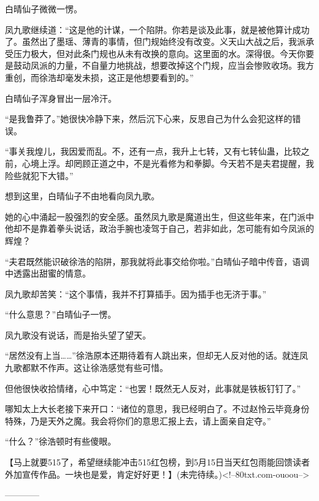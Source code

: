 \begin{this_body}
白晴仙子微微一愣。

凤九歌继续道：“这是他的计谋，一个陷阱。你若是谈及此事，就是被他算计成功了。虽然出了墨瑶、薄青的事情，但门规始终没有改变。义天山大战之后，我派承受压力极大，但对此条门规也从未有改换的意向。这里面的水。深得很。今天你要是鼓动凤派的力量，不自量力地挑战，想要改掉这个门规，应当会惨败收场。我方重创，而徐浩却毫发未损，这正是他想要看到的。”

白晴仙子浑身冒出一层冷汗。

“是我鲁莽了。”她很快冷静下来，然后沉下心来，反思自己为什么会犯这样的错误。

“事关我煌儿，我因爱而乱。不，还有一点，我升上七转，又有七转仙蛊，比较之前，心境上浮。却罔顾正道之中，不是光看修为和拳脚。今天若不是夫君提醒，我险些就犯下大错。”

想到这里，白晴仙子不由地看向凤九歌。

她的心中涌起一股强烈的安全感。虽然凤九歌是魔道出生，但这些年来，在门派中他却不是靠着拳头说话，政治手腕也凌驾于自己，若非如此，怎可能有如今凤派的辉煌？

“夫君既然能识破徐浩的陷阱，那我就将此事交给你啦。”白晴仙子暗中传音，语调中透露出甜蜜的情意。

凤九歌却苦笑：“这个事情，我并不打算插手。因为插手也无济于事。”

“什么意思？”白晴仙子一愣。

凤九歌没有说话，而是抬头望了望天。

“居然没有上当……”徐浩原本还期待着有人跳出来，但却无人反对他的话。就连凤九歌都默不作声。这让徐浩感觉有些可惜。

但他很快收拾情绪，心中笃定：“也罢！既然无人反对，此事就是铁板钉钉了。”

哪知太上大长老接下来开口：“诸位的意思，我已经明白了。不过赵怜云毕竟身份特殊，乃是天外之魔。我会将你们的意思汇报上去，请上面亲自定夺。”

“什么？”徐浩顿时有些傻眼。

【马上就要515了，希望继续能冲击515红包榜，到5月15日当天红包雨能回馈读者外加宣传作品。一块也是爱，肯定好好更！】(未完待续。)<!--80txt.com-ouoou-->

------------

\end{this_body}

